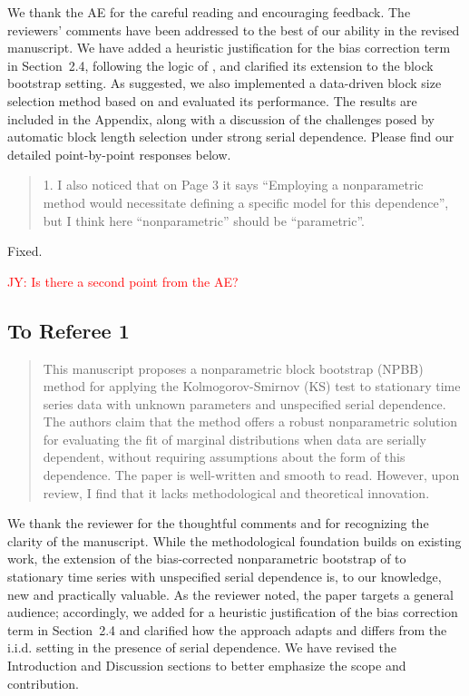 \documentclass[12pt]{article}
\newcommand{\jy}[1]{\textcolor{red}{JY: #1}}
\newenvironment{comment}%
{\begin{quotation}\noindent\small\it\color{darkblue}\ignorespaces%
}{\end{quotation}}
\begin{document}
We thank the AE for the careful reading and encouraging feedback. The
reviewers’ comments have been addressed to the best of our ability in
the revised manuscript. We have added a heuristic justification for
the bias correction term in Section~2.4, following the logic of
\citet{babu2004goodness}, and clarified its extension to the block
bootstrap setting. As suggested, we also implemented a data-driven
block size selection method based on \citet{politis2004automatic} and
evaluated its performance. The results are included in the Appendix,
along with a discussion of the challenges posed by automatic block
length selection under strong serial dependence. Please find our
detailed point-by-point responses below.

\begin{comment}
1. I also noticed that on Page 3 it says “Employing a nonparametric method would necessitate defining a specific model for this dependence”, but I think here “nonparametric” should be “parametric”.
\end{comment}

Fixed.

\jy{Is there a second point from the AE?}

\subsection*{To Referee 1}

\begin{comment}
This manuscript proposes a nonparametric block bootstrap (NPBB) method for applying the
Kolmogorov-Smirnov (KS) test to stationary time series data with unknown parameters and unspecified serial dependence. The authors claim that the method offers a robust nonparametric solution for evaluating the fit of marginal distributions when data are serially dependent, without
requiring assumptions about the form of this dependence. The paper is well-written and smooth
to read. However, upon review, I find that it lacks methodological and theoretical innovation.
\end{comment}


We thank the reviewer for the thoughtful comments and for recognizing
the clarity of the manuscript. While the methodological foundation
builds on existing work, the extension of the bias-corrected
nonparametric bootstrap of \citet{babu2004goodness} to stationary time
series with unspecified serial dependence is, to our knowledge, new
and practically valuable. As the reviewer noted, the paper targets a
general audience; accordingly, we added for a heuristic justification
of the bias correction term in Section~2.4 and clarified how the
approach adapts and differs from the i.i.d. setting in the presence of
serial dependence. We have revised the Introduction and Discussion
sections to better emphasize the scope and contribution.
\end{document}
